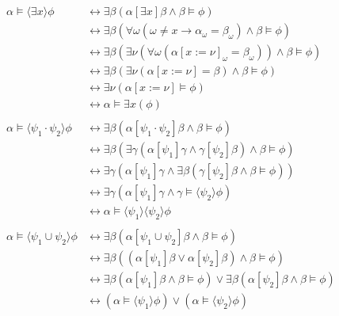 \documentclass[12pt]{article}
\begin{document}
\begin{align}
\alpha\models\langle\exists x\rangle\phi
 & \leftrightarrow \exists\beta (\alpha[\exists x]\beta \wedge \beta\models\phi) \nonumber\\
 & \leftrightarrow \exists\beta (\forall\omega (\omega \neq x \rightarrow \alpha_{\omega} = \beta_{\omega}) \wedge \beta\models\phi) \nonumber\\
 & \leftrightarrow \exists\beta (\exists\nu (\forall\omega (\alpha[x:=\nu]_{\omega} = \beta_{\omega})) \wedge \beta\models\phi) \nonumber\\
 & \leftrightarrow \exists\beta (\exists\nu (\alpha[x:=\nu] = \beta) \wedge \beta\models\phi) \nonumber\\
 & \leftrightarrow \exists\nu (\alpha[x:=\nu]\models\phi) \nonumber\\
 & \leftrightarrow \alpha\models\exists x (\phi) \label{conv_exists}\\\nonumber\\
%
\alpha\models\langle\psi_1\cdot\psi_2\rangle\phi
 & \leftrightarrow \exists\beta (\alpha[\psi_1\cdot\psi_2]\beta \wedge \beta\models\phi) \nonumber\\
 & \leftrightarrow \exists\beta(\exists\gamma (\alpha[\psi_1]\gamma \wedge \gamma[\psi_2]\beta) \wedge \beta\models\phi) \nonumber\\
 & \leftrightarrow \exists\gamma (\alpha[\psi_1]\gamma \wedge \exists\beta(\gamma[\psi_2]\beta \wedge \beta\models\phi)) \nonumber\\
 & \leftrightarrow \exists\gamma (\alpha[\psi_1]\gamma \wedge \gamma\models\langle\psi_2\rangle\phi) \nonumber\\
 & \leftrightarrow \alpha\models\langle\psi_1\rangle\langle\psi_2\rangle\phi \label{conv_and}\\\nonumber\\
%
\alpha\models\langle\psi_1 \cup \psi_2\rangle\phi
 & \leftrightarrow \exists\beta (\alpha[\psi_1 \cup \psi_2]\beta \wedge \beta\models\phi) \nonumber\\
 & \leftrightarrow \exists\beta ((\alpha[\psi_1]\beta \vee \alpha[\psi_2]\beta) \wedge \beta\models\phi) \nonumber\\
 & \leftrightarrow \exists\beta (\alpha[\psi_1]\beta \wedge \beta\models\phi) \vee \exists\beta (\alpha[\psi_2]\beta \wedge \beta\models\phi) \nonumber\\
 & \leftrightarrow (\alpha\models\langle\psi_1\rangle\phi) \vee (\alpha\models\langle\psi_2\rangle\phi) \nonumber\\

\end{align}
\end{document}
